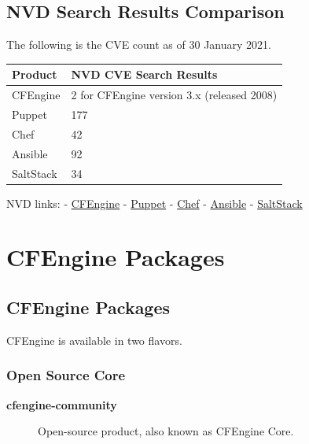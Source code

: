 \subsection{NVD Search Results Comparison}

The following is the CVE count as of 30 January 2021.

\begin{longtable}{|l|l|}
\hline
Product & NVD CVE Search Results\\
\hline
CFEngine & 2 for CFEngine version 3.x (released 2008)\\
Puppet & 177\\
Chef & 42\\
Ansible & 92\\
SaltStack & 34\\
\hline
\end{longtable}

NVD links:
- \href{https://nvd.nist.gov/vuln/search/results?form_type=Basic&results_type=overview&query=cfengine&search_type=all}{CFEngine}
- \href{https://nvd.nist.gov/vuln/search/results?form_type=Basic&results_type=overview&query=puppet&search_type=all}{Puppet}
- \href{https://nvd.nist.gov/vuln/search/results?form_type=Basic&results_type=overview&query=chef&search_type=all}{Chef}
- \href{https://nvd.nist.gov/vuln/search/results?form_type=Basic&results_type=overview&query=ansible&search_type=all}{Ansible}
- \href{https://nvd.nist.gov/vuln/search/results?form_type=Basic&results_type=overview&query=saltstack&search_type=all}{SaltStack}





\section{CFEngine Packages}





\subsection{CFEngine Packages}

CFEngine is available in two flavors.

\subsubsection{Open Source Core}

\begin{description}
\item[\textbf{cfengine-community}] Open-source product, also known as CFEngine Core.
\end{description}

